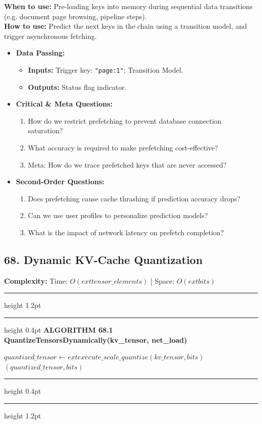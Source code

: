 \documentclass[11pt,a4paper]{article}
\newenvironment{textbookalgo}[2]{%
  \par\addvspace{1.2em}\noindent
  \hrule height 1.2pt
  \vspace{1.5pt}
  \hrule height 0.4pt
  \vspace{5pt}
  {\noindent\large\bfseries\sffamily ALGORITHM #1 \quad #2}
  \par\vspace{5pt}
  \RestyleAlgo{plain}
}{%
  \par\vspace{4pt}
  \hrule height 0.4pt
  \vspace{1.5pt}
  \hrule height 1.2pt
  \par\addvspace{1.2em}
}
\theoremstyle{definition}
\begin{document}
\noindent
\textbf{When to use:} Pre-loading keys into memory during sequential data transitions (e.g. document page browsing, pipeline steps).\\
\textbf{How to use:} Predict the next keys in the chain using a transition model, and trigger asynchronous fetching.
\begin{itemize}[leftmargin=*]
  \item[] \textbf{Data Passing:}
    \begin{itemize}
      \item \textbf{Inputs:} Trigger key: \texttt{"page:1"}; Transition Model.
      \item \textbf{Outputs:} Status flag indicator.
    \end{itemize}
  \item[] \textbf{Critical \& Meta Questions:}
  \begin{enumerate}
    \item How do we restrict prefetching to prevent database connection saturation?
    \item What accuracy is required to make prefetching cost-effective?
    \item Meta: How do we trace prefetched keys that are never accessed?
  \end{enumerate}
  \item[] \textbf{Second-Order Questions:}
  \begin{enumerate}
    \item Does prefetching cause cache thrashing if prediction accuracy drops?
    \item Can we use user profiles to personalize prediction models?
    \item What is the impact of network latency on prefetch completion?
  \end{enumerate}
\end{itemize}
\medskip

\clearpage
\subsection{68. Dynamic KV-Cache Quantization}


\noindent
\textbf{Complexity:} Time: $O(	ext{tensor\_elements})$ | Space: $O(	ext{bits})$
\smallskip

\begin{textbookalgo}{68.1}{QuantizeTensorsDynamically(kv\_tensor, net\_load)}
\begin{algorithm}[H]
$quantized\_tensor \leftarrow 	ext{execute\_scale\_quantize}(kv\_tensor, bits)$\;
\Return $(quantized\_tensor, bits)$\;
\end{algorithm}
\end{textbookalgo}
\end{document}
